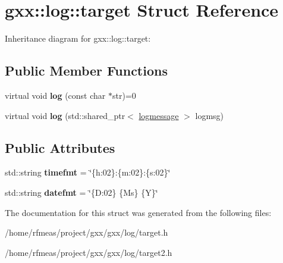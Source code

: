 \hypertarget{classgxx_1_1log_1_1target}{}\section{gxx\+:\+:log\+:\+:target Struct Reference}
\label{classgxx_1_1log_1_1target}


Inheritance diagram for gxx\+:\+:log\+:\+:target\+:
\subsection*{Public Member Functions}
\begin{DoxyCompactItemize}
\item 
virtual void {\bfseries log} (const char $\ast$str)=0\hypertarget{classgxx_1_1log_1_1target_aacaa566ad432346ca6e169203f5cd09f}{}\label{classgxx_1_1log_1_1target_aacaa566ad432346ca6e169203f5cd09f}

\item 
virtual void {\bfseries log} (std\+::shared\+\_\+ptr$<$ \hyperlink{structgxx_1_1log_1_1logmessage}{logmessage} $>$ logmsg)\hypertarget{classgxx_1_1log_1_1target_a75049f056907db10a2a26d9e8e793c72}{}\label{classgxx_1_1log_1_1target_a75049f056907db10a2a26d9e8e793c72}

\end{DoxyCompactItemize}
\subsection*{Public Attributes}
\begin{DoxyCompactItemize}
\item 
std\+::string {\bfseries timefmt} = \char`\"{}\{h\+:02\}\+:\{m\+:02\}\+:\{s\+:02\}\char`\"{}\hypertarget{classgxx_1_1log_1_1target_a9ec6cafbb6f509002cb1fa118cbcc742}{}\label{classgxx_1_1log_1_1target_a9ec6cafbb6f509002cb1fa118cbcc742}

\item 
std\+::string {\bfseries datefmt} = \char`\"{}\{D\+:02\} \{Ms\} \{Y\}\char`\"{}\hypertarget{classgxx_1_1log_1_1target_ac291eef5912f351e5dc4bfaf922adfd3}{}\label{classgxx_1_1log_1_1target_ac291eef5912f351e5dc4bfaf922adfd3}

\end{DoxyCompactItemize}


The documentation for this struct was generated from the following files\+:\begin{DoxyCompactItemize}
\item 
/home/rfmeas/project/gxx/gxx/log/target.\+h\item 
/home/rfmeas/project/gxx/gxx/log/target2.\+h\end{DoxyCompactItemize}
